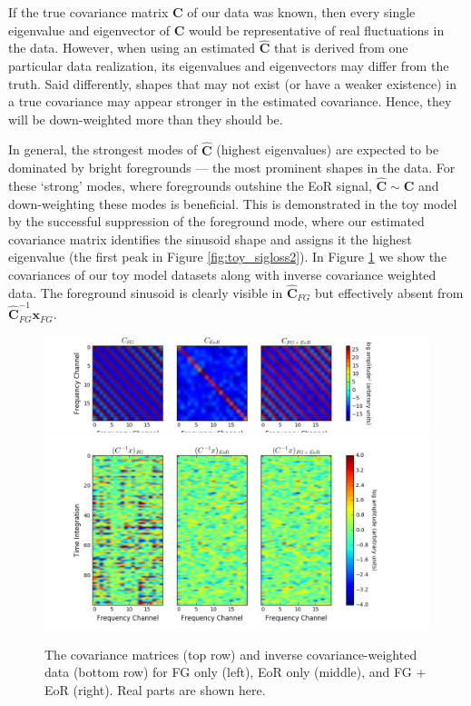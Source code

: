 \documentclass[preprint2,numberedappendix,tighten]{aastex6}  %
\begin{document}
If the true covariance matrix $\textbf{C}$ of our data was known, then every single eigenvalue and eigenvector of $\textbf{C}$ would be 
representative of real fluctuations in the data. However, when using an estimated $\hat{\textbf{C}}$ that is derived from one 
particular data realization, its eigenvalues and eigenvectors may differ from the truth. Said differently, shapes that may not exist (or have a 
weaker existence) in a true covariance may appear stronger in the estimated covariance. Hence, they will be down-weighted 
more than they should be.

In general, the strongest modes of $\hat{\textbf{C}}$ (highest eigenvalues) are expected to be dominated by bright foregrounds 
--- the most prominent shapes in the data. For these `strong' modes, where foregrounds outshine the EoR signal, $
\hat{\textbf{C}} \sim \textbf{C}$ and down-weighting these modes is beneficial. This is demonstrated in the toy model by the 
successful suppression of the foreground mode, where our estimated covariance matrix identifies the sinusoid shape and 
assigns it the highest eigenvalue (the first peak in Figure \ref{fig:toy_sigloss2}). In Figure \ref{fig:toy_sigloss12} we show the 
covariances of our toy model datasets along with inverse covariance weighted data. The foreground sinusoid is clearly visible in 
$\hat{\textbf{C}}_{FG}$ but effectively absent from $\hat{\textbf{C}}^{-1}_{FG}\textbf{x}_{FG}$.

\begin{figure}
	\centering
	\includegraphics[trim={1.5cm 0cm 3.5cm 0.1cm},clip,width=\columnwidth]{plots/toy_sigloss12.png}
	\includegraphics[trim={1.5cm 0cm 3.5cm 0.1cm},clip,width=\columnwidth]{plots/toy_sigloss13.png}
	\caption{The covariance matrices (top row) and inverse covariance-weighted data (bottom row) for FG only (left), EoR only 
(middle), and FG + EoR (right). Real parts are shown here.}
	\label{fig:toy_sigloss12}
\end{figure}
\end{document}

